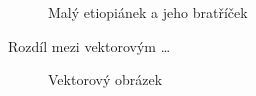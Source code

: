 \documentclass[11pt]{article}
\begin{document}
\begin{figure}[h]
{    }
    \caption{Malý etiopiánek a jeho bratříček}
    \label{Obrazek 1}
\end{figure}
\newpage
Rozdíl mezi vektorovým \dots

\begin{figure}[h]
    \centering
    \caption{Vektorový obrázek}
    \label{Obrazek 2}
\end{figure}
\end{document}

